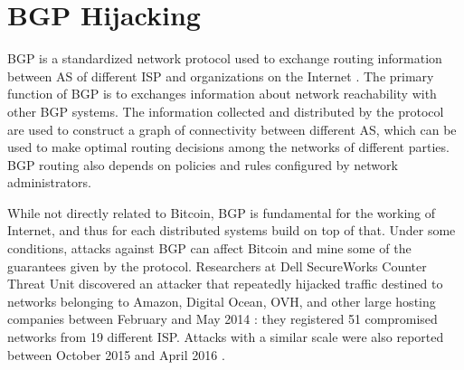 \section{BGP Hijacking}
\ac{BGP} is a standardized network protocol used to exchange routing information between \ac{AS} of different \ac{ISP} and organizations on the Internet \cite{rfc4271, bgp_wikipedia}.
The primary function of \ac{BGP} is to exchanges information about network reachability with other \ac{BGP} systems.
The information collected and distributed by the protocol are used to construct a graph of connectivity between different \ac{AS}, which can be used to make optimal routing decisions among the networks of different parties.
\ac{BGP} routing also depends on policies and rules configured by network administrators.

\bigskip
While not directly related to Bitcoin, \ac{BGP} is fundamental for the working of Internet, and thus for each distributed systems build on top of that.
Under some conditions, attacks against \ac{BGP} can affect Bitcoin and mine some of the guarantees given by the protocol.
Researchers at Dell SecureWorks Counter Threat Unit discovered an attacker that repeatedly hijacked traffic destined to networks belonging to Amazon, Digital Ocean, OVH, and other large hosting companies between February and May 2014 \cite{bgp_hijacking_secureworks}:
they registered \num{51} compromised networks from \num{19} different \ac{ISP}.
Attacks with a similar scale were also reported between October 2015 and April 2016 \cite{hijacking_bitcoin_2017, bgpstream}.

\pagebreak

